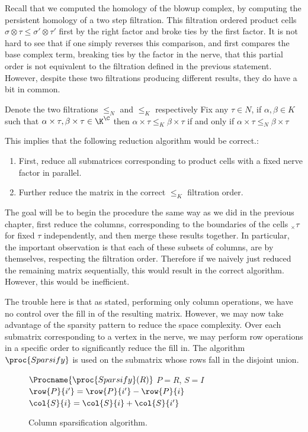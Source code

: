 Recall that we computed the homology of the blowup complex, by computing the persistent homology of a two step filtration. This filtration ordered product cells $\sigma \otimes \tau \leq \sigma'  \otimes \tau'$ first by the right factor and broke ties by the first factor. It is not hard to see that if one simply reverses this comparison, and first compares the base complex term, breaking ties by the factor in the nerve, that this partial order is not equivalent to the filtration defined in the previous statement. However, despite these two filtrations producing different results, they do have a bit in common. 
\begin{lemma}
Denote the two filtrations $\leq_N$ and $\leq_K$ respectively
Fix any $\tau \in N$, if $\alpha, \beta \in K$ such that $\alpha \times \tau, \beta \times \tau \in \K^\C$ then $\alpha \times \tau \leq_K \beta \times \tau$ if and only if $\alpha \times \tau \leq_N \beta \times \tau$
\end{lemma}

This implies that the following reduction algorithm would be correct.:
\begin{enumerate}
\item First, reduce all submatrices corresponding to product cells with a fixed nerve factor in parallel. 
\item Further reduce the matrix in the correct $\leq_K$ filtration order.
\end{enumerate}
The goal will be to begin the procedure the same way as we did in the previous chapter, first reduce the columns, corresponding to the boundaries of the cells $_ \times \tau$ for fixed $\tau$ independently, and then merge these results together. In particular, the important observation is that each of these subsets of columns, are by themselves, respecting the filtration order. Therefore if we naively just reduced the remaining matrix sequentially, this would result in the correct algorithm. However, this would be inefficient.

The trouble here is that as stated, performing only column operations, we have no control over the fill in of the resulting matrix. However, we may now take advantage of the sparsity pattern to reduce the space complexity. Over each submatrix corresponding to a vertex in the nerve, we may perform row operations in a specific order to significantly reduce the fill in. The algorithm $\proc{Sparsify}$ is used on the submatrix whose rows fall in the disjoint union.

\begin{figure}
\begin{codebox}
$\Procname{\proc{Sparsify}(R)}$
\li $P = R$, $S = I$
\li    {} 
\li \Do {}
\li            {}
\li {}
\li		  $\row{P}{i'} = \row{P}{i'} - \row{P}{i}$  
\li		  $\col{S}{i} = \col{S}{i} + \col{S}{i'}$
            \End
        \End
    \End
\end{codebox}
\caption{Column sparsification algorithm.}
\label{alg:sparsify}
\end{figure}

